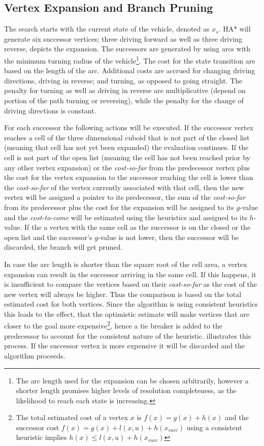 \subsection{Vertex Expansion and Branch Pruning}
The search starts with the current state of the vehicle, denoted as $x_s$. HA* will generate six successor vertices; three driving forward as well as three driving reverse,  depicts the expansion. The successors are generated by using arcs with the minimum turning radius of the vehicle\footnote{The arc length used for the expansion can be chosen arbitrarily, however a shorter length promises higher levels of resolution completeness, as the likelihood to reach each state is increasing.}. The cost for the state transition are based on the length of the arc. Additional costs are accrued for changing driving directions, driving in reverse; and turning, as opposed to going straight. The penalty for turning as well as driving in reverse are multiplicative (depend on portion of the path turning or reversing), while the penalty for the change of driving directions is constant.

For each successor the following actions will be executed. If the successor vertex reaches a cell of the three dimensional cuboid that is not part of the closed list (meaning that cell has not yet been expanded) the evaluation continues. If the cell is not part of the open list (meaning the cell has not been reached prior by any other vertex expansion) or the \textit{cost-so-far} from the predecessor vertex plus the cost for the vertex expansion to the successor reaching the cell is lower than the \textit{cost-so-far} of the vertex currently associated with that cell, then the new vertex will be assigned a pointer to its predecessor, the sum of the \textit{cost-so-far} from its predecessor plus the cost for the expansion will be assigned to its $g$-value and the \textit{cost-to-come} will be estimated using the heuristics and assigned to its $h$-value. If the a vertex with the same cell as the successor is on the closed or the open list and the successor's $g$-value is not lower, then the successor will be discarded, the branch will get pruned.

In case the arc length is shorter than the square root of the cell area, a vertex expansion can result in the successor arriving in the same cell. 
If this happens, it is insufficient to compare the vertices based on their \textit{cost-so-far} as the cost of the new vertex will always be higher. Thus the comparison is based on the total estimated cost for both vertices. Since the algorithm is using consistent heuristics this leads to the effect, that the optimistic estimate will make vertices that are closer to the goal more expensive\footnote{The total estimated cost of a vertex $x$ is $f(x) = g(x)+h(x)$ and the successor cost $f(x) = g(x) + l(x,u)  + h(x_{succ}) $ using a consistent heuristic implies $ h(x) \leq  l(x,u)  + h(x_{succ})$}, hence a tie breaker is added to the predecessor to account for the consistent nature of the heuristic. illustrates this process. If the successor vertex is more expensive it will be discarded and the algorithm proceeds.

